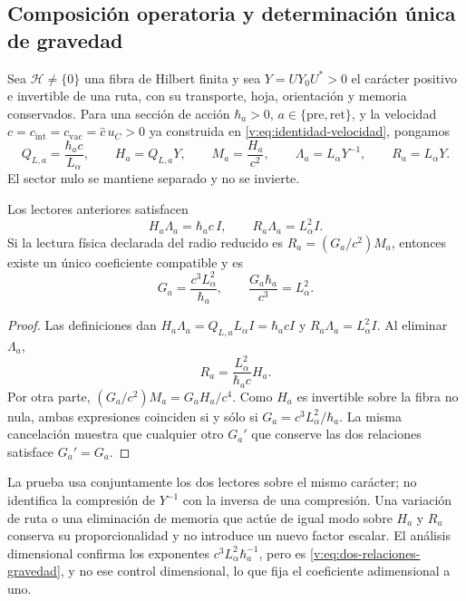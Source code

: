 \subsection{Composición operatoria y determinación única de gravedad}

Sea $\mathcal H\ne\{0\}$ una fibra de Hilbert finita y sea $Y=UY_0U^*>0$
el carácter positivo e invertible de una ruta, con su transporte, hoja,
orientación y memoria conservados. Para una sección de acción
$\hbar_a>0$, $a\in\{\mathrm{pre},\mathrm{ret}\}$, y la velocidad
$c=c_{\mathrm{int}}=c_{\mathrm{vac}}=\widehat c\,u_C>0$ ya construida en
\eqref{v:eq:identidad-velocidad}, pongamos
\begin{equation}
 Q_{L,a}=\frac{\hbar_ac}{L_\alpha},\qquad
 H_a=Q_{L,a}Y,\qquad M_a=\frac{H_a}{c^2},\qquad
 \Lambda_a=L_\alpha Y^{-1},\qquad R_a=L_\alpha Y.
 \label{v:eq:lectores-longitud-accion}
\end{equation}
El sector nulo se mantiene separado y no se invierte.

\begin{theorem}
\label{v:thm:gravedad-unica-alpha}
Los lectores anteriores satisfacen
\begin{equation}
 H_a\Lambda_a=\hbar_ac\,I,\qquad
 R_a\Lambda_a=L_\alpha^2I.
 \label{v:eq:dos-relaciones-gravedad}
\end{equation}
Si la lectura física declarada del radio reducido es
$R_a=(G_a/c^2)M_a$, entonces existe un único coeficiente compatible y es
\begin{equation}
 \boxed{G_a=\frac{c^3L_\alpha^2}{\hbar_a}},
 \qquad
 \boxed{\frac{G_a\hbar_a}{c^3}=L_\alpha^2}.
 \label{v:eq:gravedad-unica-alpha}
\end{equation}
\end{theorem}
\begin{proof}
Las definiciones dan
$H_a\Lambda_a=Q_{L,a}L_\alpha I=\hbar_acI$ y
$R_a\Lambda_a=L_\alpha^2I$. Al eliminar $\Lambda_a$,
\[
 R_a=\frac{L_\alpha^2}{\hbar_ac}H_a.
\]
Por otra parte,
$(G_a/c^2)M_a=G_aH_a/c^4$. Como $H_a$ es invertible sobre la fibra
no nula, ambas expresiones coinciden si y sólo si
$G_a=c^3L_\alpha^2/\hbar_a$. La misma cancelación muestra que cualquier
otro $G_a'$ que conserve las dos relaciones satisface $G_a'=G_a$.
\end{proof}

La prueba usa conjuntamente los dos lectores sobre el mismo carácter; no
identifica la compresión de $Y^{-1}$ con la inversa de una compresión. Una
variación de ruta o una eliminación de memoria que actúe de igual modo
sobre $H_a$ y $R_a$ conserva su proporcionalidad y no introduce un nuevo
factor escalar. El análisis dimensional confirma los exponentes
$c^3L_\alpha^2\hbar_a^{-1}$, pero es
\eqref{v:eq:dos-relaciones-gravedad}, y no ese control dimensional, lo que
fija el coeficiente adimensional a uno.


